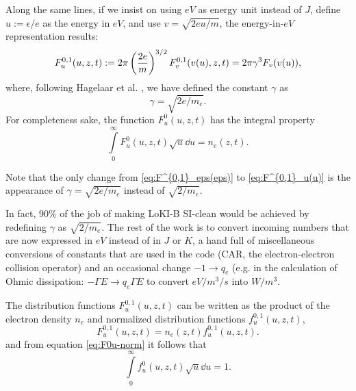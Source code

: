 \documentclass{book}
\begin{document}
Along the same lines, if we insist on using $\si{eV}$ as energy unit instead of $J$, define
$u:=\epsilon/e$ as the energy in $eV$, and use $v=\sqrt{2eu/m}$, the energy-in-$\si{eV}$
representation results:
\begin{equation}
	F^{0,1}_u(u,z,t)
	:=
	2\pi \left(\frac{2e}{m}\right)^{3/2}F^{0,1}_v(v(u),z,t)
	= 2\pi\gamma^3F_v(v(u)),
	\label{eq:F^{0,1}_u(u)}
\end{equation}
where, following Hagelaar et al. \cite[below eq. 6]{Hagelaar2005}, we have
defined the constant $\gamma$ as
\begin{equation}
  \gamma = \sqrt{2e/m_e}.
  \label{eq:gamma}
\end{equation}
For completeness sake, the function $F^0_u(u,z,t)$ has the integral property
\begin{equation}
	\int\limits_0^\infty F^0_u(u,z,t)\sqrt{u}\dd{u}=n_e(z,t).
	\label{eq:F0u-norm}
\end{equation}
\begin{framed}
 \noindent Note that the only change from \eqref{eq:F^{0,1}_eps(eps)} to
  \eqref{eq:F^{0,1}_u(u)} is the appearance of $\gamma=\sqrt{2e/m_e}$ instead
  of $\sqrt{2/m_e}$.

  In fact, 90\% of the job of making LoKI-B SI-clean would be achieved by
  redefining $\gamma$ as $\sqrt{2/m_e}$. The rest of the work is to convert
  incoming numbers that are now expressed in $\si{eV}$ instead of in $\si{J}$
  or $K$, a hand full of miscellaneous conversions of constants that are
  used in the code (CAR, the electron-electron collision operator) and an
  occasional change $-1 \rightarrow q_e$ (e.g. in the calculation of Ohmic
  dissipation: $-\Gamma E \rightarrow q_e\Gamma E$ to convert $\si{eV/m^3/s}$ into
  $\si{W/m^3}$.
\end{framed}

The distribution functions $F^{0,1}_u(u,z,t)$ can be written as the product of the electron
density $n_e$ and normalized distribution functions $f^{0,1}_u(u,z,t)$,
\begin{equation}
	F^{0,1}_u(u,z,t)=n_e(z,t)f^{0,1}_u(u,z,t).
	\label{eq:F=n_ef}
\end{equation}
and from equation \eqref{eq:F0u-norm} it follows that
\begin{equation}
	\int\limits_0^\infty f^0_u(u,z,t)\sqrt{u}\dd{u}=1.
	\label{eq:f0u-norm}
\end{equation}
\end{document}
